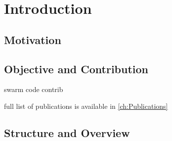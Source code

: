 
\chapter{Introduction}
\label{ch:Introduction}


\section{Motivation}
\label{ch:Introduction:sec:Motivation}


\section{Objective and Contribution}
\label{ch:Introduction:sec:ObjectiveContribution}

swarm code contrib \cite{Mahe2014,Mahe2015}

full list of publications is available in \ref{ch:Publications}


\section{Structure and Overview}
\label{ch:Introduction:sec:StructureOverview}
